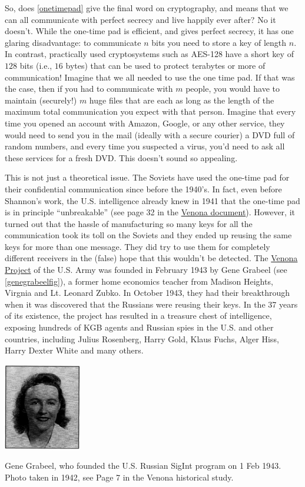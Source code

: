 So, does \cref{onetimepad} give the final word on cryptography, and
means that we can all communicate with perfect secrecy and live happily
ever after? No it doesn't. While the one-time pad is efficient, and
gives perfect secrecy, it has one glaring disadvantage: to communicate
\(n\) bits you need to store a key of length \(n\). In contrast,
practically used cryptosystems such as AES-128 have a short key of
\(128\) bits (i.e., \(16\) bytes) that can be used to protect terabytes
or more of communication! Imagine that we all needed to use the one time
pad. If that was the case, then if you had to communicate with \(m\)
people, you would have to maintain (securely!) \(m\) huge files that are
each as long as the length of the maximum total communication you expect
with that person. Imagine that every time you opened an account with
Amazon, Google, or any other service, they would need to send you in the
mail (ideally with a secure courier) a DVD full of random numbers, and
every time you suspected a virus, you'd need to ask all these services
for a fresh DVD. This doesn't sound so appealing.

This is not just a theoretical issue. The Soviets have used the one-time
pad for their confidential communication since before the 1940's. In
fact, even before Shannon's work, the U.S. intelligence already knew in
1941 that the one-time pad is in principle ``unbreakable'' (see page 32
in the \href{http://nsarchive.gwu.edu/NSAEBB/NSAEBB278/01.PDF}{Venona
document}). However, it turned out that the hassle of manufacturing so
many keys for all the communication took its toll on the Soviets and
they ended up reusing the same keys for more than one message. They did
try to use them for completely different receivers in the (false) hope
that this wouldn't be detected. The
\href{https://en.wikipedia.org/wiki/Venona_project}{Venona Project} of
the U.S. Army was founded in February 1943 by Gene Grabeel (see
\cref{genegrabeelfig}), a former home economics teacher from Madison
Heights, Virgnia and Lt. Leonard Zubko. In October 1943, they had their
breakthrough when it was discovered that the Russians were reusing their
keys. In the 37 years of its existence, the project has resulted in a
treasure chest of intelligence, exposing hundreds of KGB agents and
Russian spies in the U.S. and other countries, including Julius
Rosenberg, Harry Gold, Klaus Fuchs, Alger Hiss, Harry Dexter White and
many others.

\begin{marginfigure}
\centering
\includegraphics[width=\linewidth, height=1.5in, keepaspectratio]{../figure/genevenona.png}
\caption{Gene Grabeel, who founded the U.S. Russian SigInt program on 1
Feb 1943. Photo taken in 1942, see Page 7 in the Venona historical
study.}
\label{genegrabeelfig}
\end{marginfigure}

